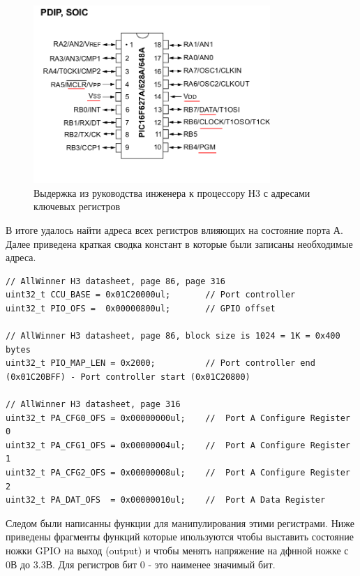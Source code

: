 \begin{figure}[h!]
    \centering
    \includegraphics[width=0.8\textwidth]{2017-05-07_at_22:31:52_screenshot.png}
    \caption{Выдержка из руководства инженера к процессору Н3 с адресами ключевых регистров}
\end{figure}

В итоге удалось найти адреса всех регистров влияющих на состояние порта А. Далее приведена краткая сводка констант в которые были записаны необходимые адреса.

\begin{small}
\begin{verbatim}
// AllWinner H3 datasheet, page 86, page 316
uint32_t CCU_BASE = 0x01C20000ul;       // Port controller
uint32_t PIO_OFS =  0x00000800ul;       // GPIO offset

// AllWinner H3 datasheet, page 86, block size is 1024 = 1K = 0x400 bytes 
uint32_t PIO_MAP_LEN = 0x2000;          // Port controller end (0x01C20BFF) - Port controller start (0x01C20800)

// AllWinner H3 datasheet, page 316
uint32_t PA_CFG0_OFS = 0x00000000ul;    //  Port A Configure Register 0
uint32_t PA_CFG1_OFS = 0x00000004ul;    //  Port A Configure Register 1
uint32_t PA_CFG2_OFS = 0x00000008ul;    //  Port A Configure Register 2
uint32_t PA_DAT_OFS  = 0x00000010ul;    //  Port A Data Register
\end{verbatim}
\end{small}


Следом были написанны функции для манипулирования этими регистрами. Ниже приведены фрагменты функций которые ипользуются чтобы выставить состояние ножки GPIO на выход (output) и чтобы менять напряжение на дфнной ножке с 0В до 3.3В. Для регистров бит 0 - это наименее значимый бит.


